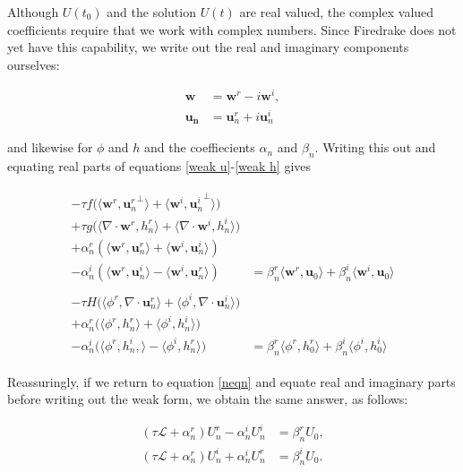 \documentclass[14pt]{article}
\def\MM#1{\boldsymbol{#1}}
\begin{document}
Although $U(t_0)$ and the solution $U(t)$ are real valued, the complex
valued coefficients require that we work with complex numbers. Since
Firedrake does not yet have this capability, we write out the real and
imaginary components ourselves:

\begin{align}
  \MM{w} &= \MM{w}^r - i\MM{w}^i, \\
  \MM{u_n} &= \MM{u}_n^r + i\MM{u}_n^i
\end{align}

\noindent and likewise for $\phi$ and $h$ and the coeffiecients
$\alpha_n$ and $\beta_n$. Writing this out and equating real parts of
equations \ref{weak u}-\ref{weak h} gives

\begin{align}
  \begin{split}
    -\tau f\big(\langle\MM{w}^r, {\MM{u}_n^r}^\perp\rangle + \langle\MM{w}^i, {\MM{u}_n^i}^\perp\rangle\big) \\
  + \tau g\big(\langle\nabla\cdot\MM{w}^r, h_n^r\rangle + \langle\nabla\cdot\MM{w}^i, h_n^i\rangle\big) \\
  + \alpha_n^r(\langle\MM{w}^r, \MM{u}_n^r\rangle + \langle\MM{w}^i, \MM{u}_n^i\rangle) \\
  - \alpha_n^i(\langle\MM{w}^r, \MM{u}_n^i\rangle - \langle\MM{w}^i, \MM{u}_n^r\rangle) &= \beta_n^r\langle\MM{w}^r, \MM{u}_0\rangle + \beta_n^i\langle\MM{w}^i, \MM{u}_0\rangle
  \end{split}\\
  \begin{split}
    -\tau H \big(\langle\phi^r, \nabla\cdot\MM{u}_n^r\rangle + \langle\phi^i, \nabla\cdot\MM{u}_n^i\rangle\big) \\
    +\alpha_n^r\big(\langle\phi^r, h_n^r\rangle + \langle\phi^i, h_n^i\rangle\big) \\
    -\alpha_n^i\big(\langle\phi^r, h_n^i,\rangle - \langle\phi^i, h_n^r\rangle\big) &= \beta_n^r\langle\phi^r, h_0^r\rangle + \beta_n^i\langle\phi^i, h_0^i\rangle
  \end{split}
\end{align}

Reassuringly, if we return to equation \ref{neqn} and equate real and
imaginary parts before writing out the weak form, we obtain the same
answer, as follows:

\begin{align}
  (\tau\mathcal{L} + \alpha_n^r)U_n^r - \alpha_n^iU_n^i &= \beta_n^rU_0, \\
  (\tau\mathcal{L} + \alpha_n^r)U_n^i + \alpha_n^iU_n^r & = \beta_n^iU_0.
\end{align}
\end{document}
